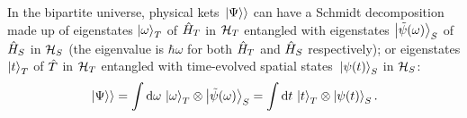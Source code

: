 In the bipartite universe, physical kets $\left.\left| \Psi \right\rangle\right\rangle$ can have a Schmidt decomposition
made up of
eigenstates $\ket{\omega}_{T}$ of $\hat{H}_T$ in $\mathcal{H}_T$
entangled with
eigenstates $\ket{\tilde{\psi}(\omega)}_{S}$ of $\hat{H}_S$ in $\mathcal{H}_S$
(the eigenvalue is $\hbar\omega$ for both $\hat{H}_T$ and $\hat{H}_S$ respectively);
or eigenstates $\ket{t}_{T}$ of $\hat{T}$ in $\mathcal{H}_T$
entangled with time-evolved spatial states~$\ket{\psi(t)}_S$ in $\mathcal{H}_S$:
\begin{equation}\label{eq:pw:time_freq_nomu}
  \left.\left| \Psi \right\rangle\right\rangle =
    \int \dd{\omega} \, \ket{\omega}_{T}\otimes\ket{\tilde{\psi}(\omega)}_{S} =
    \int \dd{t} \, \ket{t}_{T} \otimes \ket{\psi(t)}_{S} \text{.}
\end{equation}
%
%
%


